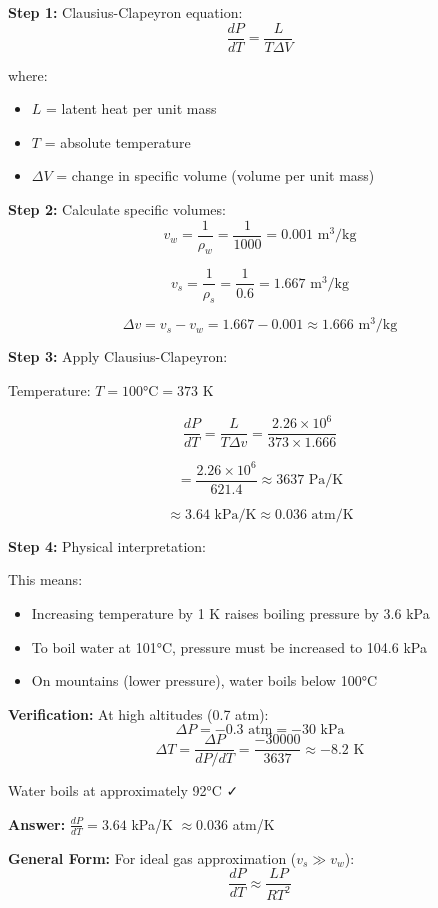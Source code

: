 \documentclass[12pt,a4paper]{article}
\begin{document}
\begin{solution}
\textbf{Step 1:} Clausius-Clapeyron equation:
$$\frac{dP}{dT} = \frac{L}{T\Delta V}$$

where:
\begin{itemize}
    \item $L$ = latent heat per unit mass
    \item $T$ = absolute temperature
    \item $\Delta V$ = change in specific volume (volume per unit mass)
\end{itemize}

\textbf{Step 2:} Calculate specific volumes:
$$v_w = \frac{1}{\rho_w} = \frac{1}{1000} = 0.001\text{ m}^3/\text{kg}$$

$$v_s = \frac{1}{\rho_s} = \frac{1}{0.6} = 1.667\text{ m}^3/\text{kg}$$

$$\Delta v = v_s - v_w = 1.667 - 0.001 \approx 1.666\text{ m}^3/\text{kg}$$

\textbf{Step 3:} Apply Clausius-Clapeyron:

Temperature: $T = 100°\text{C} = 373\text{ K}$

$$\frac{dP}{dT} = \frac{L}{T\Delta v} = \frac{2.26 \times 10^6}{373 \times 1.666}$$

$$= \frac{2.26 \times 10^6}{621.4} \approx 3637\text{ Pa/K}$$

$$\approx 3.64\text{ kPa/K} \approx 0.036\text{ atm/K}$$

\textbf{Step 4:} Physical interpretation:

This means:
\begin{itemize}
    \item Increasing temperature by 1 K raises boiling pressure by 3.6 kPa
    \item To boil water at 101°C, pressure must be increased to 104.6 kPa
    \item On mountains (lower pressure), water boils below 100°C
\end{itemize}

\textbf{Verification:} At high altitudes (0.7 atm):
$$\Delta P = -0.3\text{ atm} = -30\text{ kPa}$$
$$\Delta T = \frac{\Delta P}{dP/dT} = \frac{-30000}{3637} \approx -8.2\text{ K}$$

Water boils at approximately 92°C ✓

\textbf{Answer:} $\frac{dP}{dT} = 3.64$ kPa/K $\approx 0.036$ atm/K

\textbf{General Form:} For ideal gas approximation ($v_s \gg v_w$):
$$\frac{dP}{dT} \approx \frac{LP}{RT^2}$$
\end{solution}
\end{document}
